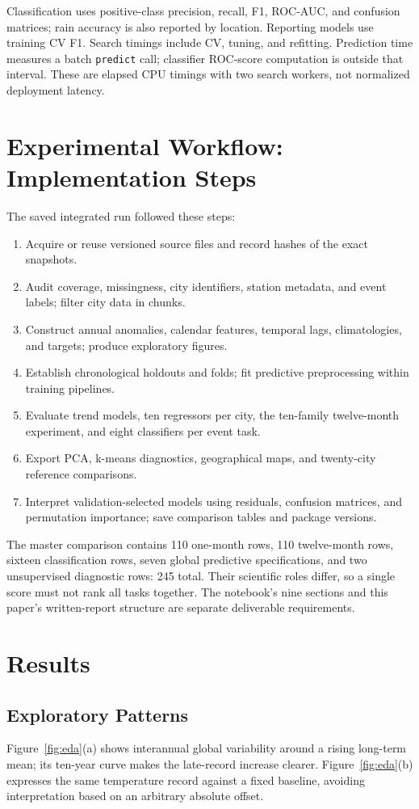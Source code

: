 \documentclass[conference]{IEEEtran}
\begin{document}
Classification uses positive-class precision, recall, F1, ROC-AUC, and confusion matrices; rain accuracy is also reported by location. Reporting models use training CV F1. Search timings include CV, tuning, and refitting. Prediction time measures a batch \texttt{predict} call; classifier ROC-score computation is outside that interval. These are elapsed CPU timings with two search workers, not normalized deployment latency.

\section{Experimental Workflow: Implementation Steps}
The saved integrated run followed these steps:
\begin{enumerate}[leftmargin=*,itemsep=2pt]
\item Acquire or reuse versioned source files and record hashes of the exact snapshots.
\item Audit coverage, missingness, city identifiers, station metadata, and event labels; filter city data in chunks.
\item Construct annual anomalies, calendar features, temporal lags, climatologies, and targets; produce exploratory figures.
\item Establish chronological holdouts and folds; fit predictive preprocessing within training pipelines.
\item Evaluate trend models, ten regressors per city, the ten-family twelve-month experiment, and eight classifiers per event task.
\item Export PCA, k-means diagnostics, geographical maps, and twenty-city reference comparisons.
\item Interpret validation-selected models using residuals, confusion matrices, and permutation importance; save comparison tables and package versions.
\end{enumerate}
The master comparison contains 110 one-month rows, 110 twelve-month rows, sixteen classification rows, seven global predictive specifications, and two unsupervised diagnostic rows: 245 total. Their scientific roles differ, so a single score must not rank all tasks together. The notebook's nine sections and this paper's written-report structure are separate deliverable requirements.

\section{Results}
\subsection{Exploratory Patterns}
Figure~\ref{fig:eda}(a) shows interannual global variability around a rising long-term mean; its ten-year curve makes the late-record increase clearer. Figure~\ref{fig:eda}(b) expresses the same temperature record against a fixed baseline, avoiding interpretation based on an arbitrary absolute offset.
\end{document}
